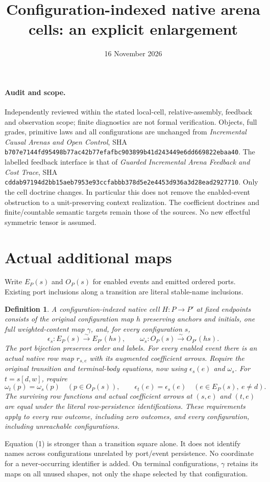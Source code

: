\documentclass[11pt]{article}
\title{Configuration-indexed native arena cells: an explicit enlargement}
\date{16 November 2026}
\newtheorem{definition}{Definition}
\begin{document}
\maketitle
\paragraph{Audit and scope.}
Independently reviewed within the stated local-cell, relative-assembly,
feedback and observation scope; finite diagnostics are not formal verification.
Objects, full grades, primitive laws and all configurations are unchanged from
\emph{Incremental Causal Arenas and Open Control}, SHA
\texttt{b707e7144fd95498b77ac42b77efafbc903899b41d243449e6dd669822ebaa40}.
The labelled feedback interface is that of \emph{Guarded Incremental Arena
Feedback and Cost Trace}, SHA
\texttt{cddab97194d2bb15aeb7953e93ccfabbb378d5e2e4453d936a3d28ead2927710}.
Only the cell doctrine changes. In particular this does not remove the
enabled-event obstruction to a unit-preserving context realization.
The coefficient doctrines and finite/countable semantic targets remain those
of the sources. No new effectful symmetric tensor is assumed.

\section{Actual additional maps}
Write $E_P(s)$ and $O_P(s)$ for enabled events and emitted ordered ports.
Existing port inclusions along a transition are literal stable-name inclusions.
\begin{definition}
A configuration-indexed native cell $H:P\to P'$ at fixed endpoints consists of
the original configuration map $h$ preserving anchors and initials, one full
weighted-content map $\gamma$, and, for every configuration $s$,
\[
 \epsilon_s:E_P(s)\xrightarrow{\sim}E_{P'}(h s),\qquad
 \omega_s:O_P(s)\xrightarrow{\sim}O_{P'}(h s).
\]
The port bijection preserves order and labels. For every enabled event there is
an actual native row map $r_{s,e}$ with its augmented coefficient arrows.
Require the original transition and terminal-body equations, now using
$\epsilon_s(e)$ and $\omega_s$.
For $t=s[d,w]$, require
\[
 \omega_t(p)=\omega_s(p)\quad(p\in O_P(s)),\qquad
 \epsilon_t(e)=\epsilon_s(e)\quad(e\in E_P(s),\ e\ne d).       \tag{1}
\]
The surviving row functions and actual coefficient arrows at $(s,e)$ and
$(t,e)$ are equal under the literal row-persistence identifications. These
requirements apply to every raw outcome, including zero outcomes, and every
configuration, including unreachable configurations.
\end{definition}
Equation (1) is stronger than a transition square alone. It does not identify
names across configurations unrelated by port/event persistence.
No coordinate for a never-occurring identifier is added. On terminal
configurations, $\gamma$ retains its maps on all unused shapes, not only the
shape selected by that configuration.
\end{document}
